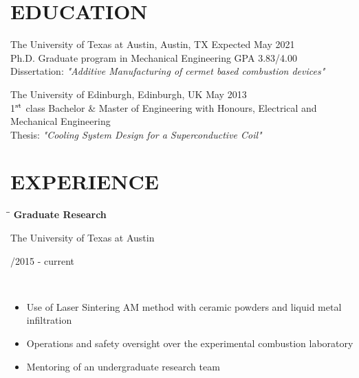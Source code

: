 \documentclass[11pt]{res}
\begin{document}
\begin{resume}

\vspace{-10pt}
\section{EDUCATION} 

\vspace{2pt}
	The University of Texas at Austin, Austin, TX \hfill Expected May 2021\\
	Ph.D. Graduate program in Mechanical Engineering \hfill GPA 3.83/4.00 \\[1pt]
	Dissertation: \textit{"Additive Manufacturing of cermet based combustion devices"}
	
\vspace{-10pt}
	The University of Edinburgh, Edinburgh, UK \hfill May 2013 \\        
	1$^\textnormal{st}$ class Bachelor \& Master of Engineering with Honours, Electrical and Mechanical Engineering   \\[1pt]
	Thesis: \textit{"Cooling System Design for a Superconductive Coil"}

\vspace{-13pt}
\section{EXPERIENCE}
 \vspace{-8pt}

   \begin{tabbing}
   \hspace{2.3in}\= \hspace{2.7in}\= \kill %
    {\bf Graduate Research} \> \parbox[c]{7.5cm}{ \centering The University of Texas at Austin }    \> \parbox[c]{3.8cm}{ /2015 - current} \\
   \end{tabbing}
   \vspace{-22pt}      %
   
	\begin{itemize}
   	\setlength{\leftmargin}{-15pt} \setlength\itemsep{0pt}
	\item Use of Laser Sintering AM method with ceramic powders and liquid metal infiltration
	\item Operations and safety oversight over the experimental combustion laboratory
	\item Mentoring of an undergraduate research team
	\end{itemize}
	

\end{resume}
\end{document}
